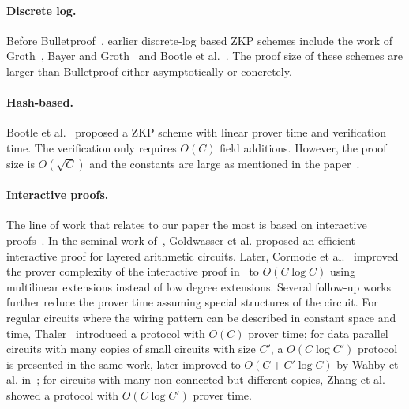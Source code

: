 \paragraph{Discrete log.} Before Bulletproof~\cite{bulletproofs}, earlier discrete-log based ZKP schemes include the work of Groth~\cite{groth2009linear}, Bayer and Groth~\cite{bayer2012efficient} and Bootle et al.~\cite{bootle2016efficient}. The proof size of these schemes are larger than Bulletproof either asymptotically or concretely.

\paragraph{Hash-based.} Bootle et al.~\cite{bootle2017linear} proposed a ZKP scheme with linear prover time and verification time. The verification only requires $O(C)$ field additions. However, the proof size is $O(\sqrt{C})$ and the constants are large as mentioned in the paper~\cite{bootle2017linear}.




\paragraph{Interactive proofs.} The line of work that relates to our paper the most is based on interactive proofs~\cite{goldwasser1989knowledge}. In the seminal work of~\cite{GKR}, Goldwasser et al. proposed an efficient interactive proof for layered arithmetic circuits. Later, Cormode et al.~\cite{CMT} improved the prover complexity of the interactive proof in~\cite{GKR} to $O(C\log C)$ using multilinear extensions instead of low degree extensions. Several follow-up works further reduce the prover time assuming special structures of the circuit. For regular circuits where the wiring pattern can be described in constant space and time, Thaler~\cite{JT_Thesis} introduced a protocol with $O(C)$ prover time; for data parallel circuits with many copies of small circuits with size $C'$, a $O(C\log C')$ protocol is presented in the same work, later improved to $O(C+C'\log C)$ by Wahby et al. in~\cite{wahby2017full}; for circuits with many non-connected but different copies, Zhang et al. showed a protocol with $O(C\log C')$ prover time.

